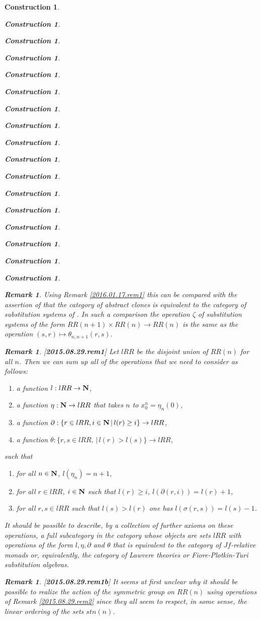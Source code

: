 \documentclass[12pt]{amsart}
\newtheorem{remark}[proposition]{Remark}
\newtheorem{construction}[proposition]{Construction}
\newcommand{\llabel}[1]{\label{#1}[{\bf #1}]}
\newcommand{\sr}{\rightarrow}
\newcommand{\nn}{{\bf N\rm}}
\newcommand{\nat}{\nn}
\begin{document}
\begin{construction}
\begin{construction}
\begin{construction}
\begin{construction}
\begin{construction}
\begin{construction}
\begin{construction}
\begin{construction}
\begin{construction}
\begin{construction}
\begin{construction}
\begin{construction}
\begin{construction}
\begin{construction}
\begin{construction}
\begin{construction}
\begin{construction}
\begin{remark}
Using Remark \ref{2016.01.17.rem1} this can be compared with the assertion of \cite[Theorem 3.3]{FPT} that the category of abstract clones is equivalent to the category of substitution systems of \cite[Definition 3.1]{FPT}. In such a comparison the operation $\zeta$ of substitution systems of the form $RR(n+1)\times RR(n)\sr RR(n)$ is the same as the operation $(s,r)\mapsto \theta_{n,n+1}(r,s)$. 
\end{remark}
%
\begin{remark}\rm
\llabel{2015.08.29.rem1}
Let $lRR$ be the disjoint union of $RR(n)$ for all $n$. Then we can sum up all of the operations that we need to consider as follows: 
%
\begin{enumerate}
\item a function $l:lRR\sr\nat$,
\item a function $\eta:\nat\sr lRR$ that takes $n$ to $x^n_0=\eta_{n}(0)$,
\item a function $\partial:\{r\in lRR, i\in\nat\,|\, l(r)\ge i\}\sr lRR$,
\item a function $\theta:\{r,s\in lRR,\,|\,l(r)>l(s)\}\sr lRR$,
\end{enumerate}
%
such that
%
\begin{enumerate}
\item for all $n\in\nat$, $l(\eta_{n})=n+1$,
\item for all $r\in lRR$, $i\in\nat $ such that $l(r)\ge i$, $l(\partial(r,i))=l(r)+1$,
\item for all $r,s\in lRR$ such that $l(s)>l(r)$ one has $l(\sigma(r,s))=l(s)-1$.
\end{enumerate}
%
It should be possible to describe, by a collection of further axioms on these operations, a full subcategory in the category whose objects are sets $lRR$ with operations of the form $l,\eta,\partial$ and $\theta$ that is equivalent to the category of $Jf$-relative monads or, equivalently, the category of Lawvere theories or Fiore-Plotkin-Turi substitution algebras. 
\end{remark}
%
\begin{remark}\rm
\llabel{2015.08.29.rem1b}
It seems at first unclear why it should be possible to realize the action of the symmetric group on $RR(n)$ using operations of Remark \ref{2015.08.29.rem2} since they all seem to respect, in some sense, the linear ordering of the sets $stn(n)$. 


\end{remark}
\end{construction}
\end{construction}
\end{construction}
\end{construction}
\end{construction}
\end{construction}
\end{construction}
\end{construction}
\end{construction}
\end{construction}
\end{construction}
\end{construction}
\end{construction}
\end{construction}
\end{construction}
\end{construction}
\end{construction}
\end{document}
